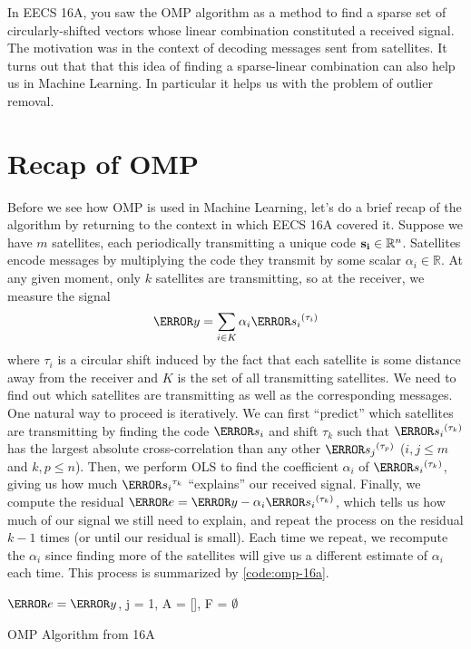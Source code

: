 

\renewcommand{\documentnumber}{x}


  \thispagestyle{fancy}
  \newpage

  In EECS 16A, you saw the OMP algorithm as a method to find a sparse set of circularly-shifted vectors whose linear combination constituted a received signal.
  The motivation was in the context of decoding messages sent from satellites. It turns out that that this idea of finding a sparse-linear combination can also help us in Machine Learning. In particular it helps us with the problem of outlier removal.
  \section{Recap of OMP}
  Before we see how OMP is used in Machine Learning, let's do a brief recap of the algorithm by returning to the context in which EECS 16A covered it. 
  Suppose we have $m$ satellites, each periodically transmitting a unique code $\mathbf{s_i}\in\mathbb{R}^n$. 
  Satellites encode messages by multiplying the code they transmit by some scalar $\alpha_i\in\mathbb{R}$.
  At any given moment, only $k$ satellites are transmitting, so at the receiver, we measure the signal
  \[
	\V{y} = \sum_{i\in K} \alpha_i\V{s_i}^{(\tau_i)}
  \]
  where $\tau_i$ is a circular shift induced by the fact that each satellite is some distance away from the receiver and $K$ is the set of all transmitting satellites.
  We need to find out which satellites are transmitting as well as the corresponding messages.
  One natural way to proceed is iteratively. We can first ``predict'' which satellites are transmitting by finding the code $\V{s_i}$ and shift $\tau_k$ such that $\V{s_i}^{(\tau_k)}$ has the largest absolute cross-correlation than any other $\V{s_j}^{(\tau_p)}$ ($i, j \leq m$ and $k, p \leq n$).
  Then, we perform OLS to find the coefficient $\alpha_i$ of $\V{s_i}^{(\tau_k)}$, giving us how much $\V{s_i}^{\tau_k}$ ``explains'' our received signal.
  Finally, we compute the residual $\V{e} = \V{y} - \alpha_i\V{s_i}^{(\tau_k)}$, which tells us how much of our signal we still need to explain, and repeat the process on the residual $k-1$ times (or until our residual is small).
  Each time we repeat, we recompute the $\alpha_i$ since finding more of the satellites will give us a different estimate of $\alpha_i$ each time.
  This process is summarized by \cref{code:omp-16a}.
  \begin{algorithm}[!h]
	\SetAlgoLined
	$\V{e} = \V{y}$, j = 1, A = [], F = $\emptyset$\;
	\caption{OMP Algorithm from 16A}
	\label{code:omp-16a}
  \end{algorithm}
